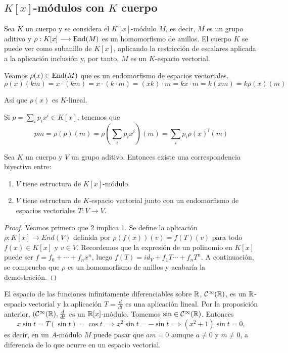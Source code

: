 \subsection{\(K[x]\)-módulos con \(K\) cuerpo}

Sea \(K\) un cuerpo y se considera el \(K[x]\)-módulo \(M\), es decir,
\(M\) es un grupo aditivo
y \(\rho: K[x] \longrightarrow \operatorname{End}(M)\) es un homomorfismo de anillos.
El cuerpo \(K\) se puede ver como subanillo de \(K[x]\), aplicando la
restricción de escalares aplicada a la aplicación inclusión y, por tanto,
\(M\) es un \(K\)-espacio vectorial.

Veamos \(\rho(x) \in \operatorname{End}(M)\) que es un endomorfismo de espacios vectoriales.
\[
  \rho(x)(km)=x\cdot (km)=x\cdot(k\cdot m)=(xk)\cdot m
  =kx\cdot m=k(xm)=k\rho(x)(m)
\]

\noindent Así que \(\rho(x)\) es \(K\)-lineal.

Si \(p=\sum_i p_i x^i\in K[x]\), tenemos que
\[
  pm = \rho(p)(m)= \rho(\sum_ip_ix^i)(m) = \sum_i p_i {\rho(x)}^i(m)
\]

\begin{prop}
  Sea \(K\) un cuerpo y \(V\) un grupo aditivo. Entonces existe una correspondencia
  biyectiva entre:

  \begin{enumerate}
  \item \(V\) tiene estructura de \(K[x]\)-módulo.
  \item \(V\) tiene estructura de \(K\)-espacio vectorial junto con un endomorfismo
    de espacios vectoriales \(T: V \longrightarrow V\).
  \end{enumerate}
\end{prop}
\begin{proof}
  Veamos primero que 2 implica 1. Se define la aplicación \(\rho: K[x] \longrightarrow
  End(V)\) definida por \(\rho(f(x))(v) = f(T)(v)\) para todo \(f(x) \in K[x]\) y
  \(v \in V\). Recordemos que la expresión de un polinomio en \(K[x]\) puede ser
  \(f = f_0 + \cdots + f_nx^n\), luego \(f(T) = id_V + f_1T \cdots + f_nT^n\). A
  continuación,
  se comprueba que \(\rho\) es un homomorfismo de anillos y acabaría la demostración.
\end{proof}

\begin{ejemplo}
  El espacio de las funciones infinitamente diferenciables sobre \(\mathbb{R}\),
  \(\mathcal{C}^\infty(\mathbb{R})\), es un \(\mathbb{R}\)-espacio vectorial y la aplicación \(T = \frac{d}{dt}\)
  es una aplicación lineal. Por la proposición anterior, \((\mathcal{C}^\infty(\mathbb{R}), \frac{d}{dt}\)
  es un \(\mathbb{R}[x]\)-módulo. Tomemos \(\sin \in \mathcal{C}^\infty(\mathbb{R})\). Entonces
  \[x\sin t=T(\sin t)=\cos t \implies x^2\sin t= -\sin t \implies (x^2+1)\sin t=0,\]
  \noindent es decir, en un \(A\)-módulo \(M\) puede pasar que \(a m=0\) aunque \(a\neq 0\)
  y \(m\neq 0\), a diferencia de lo que ocurre en un espacio vectorial.
\end{ejemplo}

